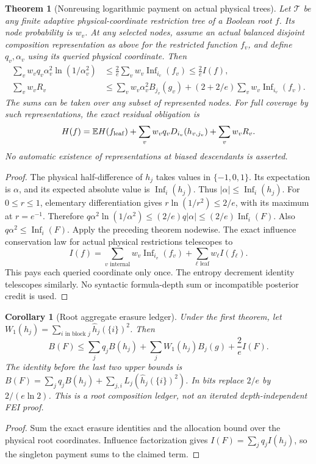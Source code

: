 \documentclass{article}
\newtheorem{theorem}{Theorem}
\newtheorem{corollary}{Corollary}
\begin{document}
\begin{theorem}[Nonreusing logarithmic payment on actual physical trees]
Let $\mathcal T$ be any finite adaptive physical-coordinate restriction
tree of a Boolean root $f$. Its node probability is $w_v$. At any selected
nodes, assume an actual balanced disjoint composition representation as
above for the restricted function $f_v$, and define $q_v,\alpha_v$
using its queried physical coordinate. Then
\begin{align*}
 \sum_v w_v q_v\alpha_v^2\ln(1/\alpha_v^2)
 &\le\frac2e\sum_v w_v\operatorname{Inf}_{i_v}(f_v)
 \le\frac2e I(f),\\
 \sum_v w_v R_v
 &\le\sum_vw_v\alpha_v^2B_{j_v}(g_v)
 +(2+2/e)\sum_vw_v\operatorname{Inf}_{i_v}(f_v).
\end{align*}
The sums can be taken over any subset of represented nodes. For full
coverage by such representations, the exact residual obligation is
\[
 H(f)=\mathbb E H(f_{\rm leaf})+
 \sum_v w_vq_vD_{i_v}(h_{v,j_v})+\sum_vw_vR_v.
\]
No automatic existence of representations at biased descendants is asserted.
\end{theorem}
\begin{proof}
The physical half-difference of $h_j$ takes values in $\{-1,0,1\}$.
Its expectation is $\alpha$, and its expected absolute value is
$\operatorname{Inf}_i(h_j)$. Thus $|\alpha|\le\operatorname{Inf}_i(h_j)$.
For $0\le r\le1$, elementary differentiation gives
$r\ln(1/r^2)\le2/e$, with its maximum at $r=e^{-1}$.
Therefore
$q\alpha^2\ln(1/\alpha^2)\le(2/e)q|\alpha|
\le(2/e)\operatorname{Inf}_i(F)$.
Also $q\alpha^2\le\operatorname{Inf}_i(F)$.
Apply the preceding theorem nodewise. The exact influence conservation
law for actual physical restrictions telescopes to
\[
 I(f)=\sum_{v\text{ internal}}w_v\operatorname{Inf}_{i_v}(f_v)
       +\sum_{\ell\text{ leaf}}w_\ell I(f_\ell).
\]
This pays each queried coordinate only once. The entropy decrement
identity telescopes similarly. No syntactic formula-depth sum or
incompatible posterior credit is used.
\end{proof}

\begin{corollary}[Root aggregate erasure ledger]
Under the first theorem, let
$W_1(h_j)=\sum_{i\text{ in block }j}\widehat h_j(\{i\})^2$.
Then
\[
 B(F)\le\sum_jq_jB(h_j)+\sum_jW_1(h_j)B_j(g)+\frac2e I(F).
\]
The identity before the last two upper bounds is
$B(F)=\sum_jq_jB(h_j)+\sum_{j,i}L_j(\widehat h_j(\{i\})^2)$.
In bits replace $2/e$ by $2/(e\ln2)$. This is a root composition
ledger, not an iterated depth-independent FEI proof.
\end{corollary}
\begin{proof}
Sum the exact erasure identities and the allocation bound over the
physical root coordinates. Influence factorization gives
$I(F)=\sum_jq_jI(h_j)$, so the singleton payment sums to the claimed term.
\end{proof}
\end{document}

